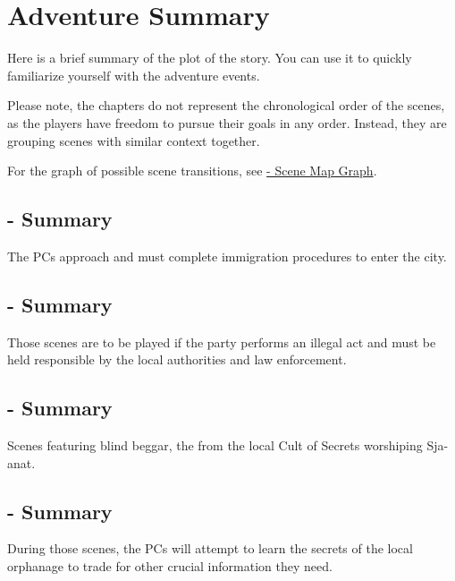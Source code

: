 \section{Adventure Summary}

Here is a brief summary of the plot of the story. You can use it to quickly familiarize yourself with the adventure events.

Please note, the chapters do not represent the chronological order of the scenes, as the players have freedom to pursue their goals in any order. Instead, they are grouping scenes with similar context together.

For the graph of possible scene transitions, see \hyperref[sec:sceneTransitions]{\myTitle{} - Scene Map Graph}.

\hypersetup{
	colorlinks,
	citecolor=blueRadiance,
	filecolor=blueRadiance,
	linkcolor=blueRadiance,
	urlcolor=blueRadiance
}


\subsection{ - Summary}

The PCs approach \locationYeddaw{} and must complete immigration procedures to enter the city.

\subsection{ - Summary}

Those scenes are to be played if the party performs an illegal act and must be held responsible by the local authorities and law enforcement.

\subsection{ - Summary}

Scenes featuring blind beggar, the \enemyCorruptedLightweaverNameC{} from the local Cult of Secrets worshiping Sja-anat.

\subsection{ - Summary}

During those scenes, the PCs will attempt to learn the secrets of the local orphanage to trade for other crucial information they need.

